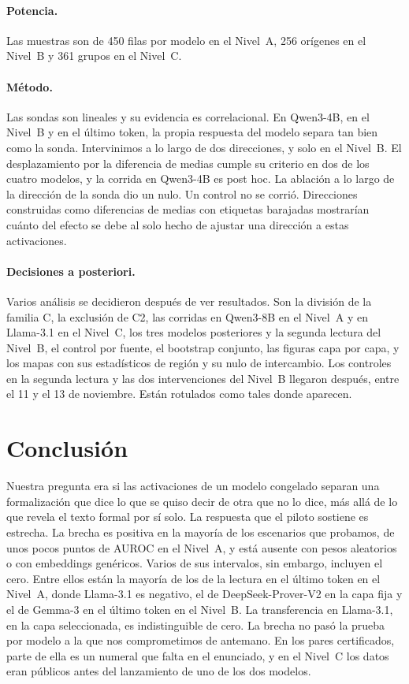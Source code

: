 \documentclass[10pt]{article}
\begin{document}
\paragraph{Potencia.}
Las muestras son de 450 filas por modelo en el Nivel~A, 256 orígenes en el Nivel~B y 361 grupos en el Nivel~C.

\paragraph{Método.}
Las sondas son lineales y su evidencia es correlacional. En Qwen3-4B, en el Nivel~B y en el último token, la propia respuesta del modelo separa tan bien como la sonda. Intervinimos a lo largo de dos direcciones, y solo en el Nivel~B. El desplazamiento por la diferencia de medias cumple
su criterio en dos de los cuatro modelos, y la corrida en Qwen3-4B es post hoc. La ablación a lo largo de la dirección
de la sonda dio un nulo.
Un control no se corrió. Direcciones construidas como diferencias de medias con etiquetas barajadas mostrarían cuánto
del efecto se debe al solo hecho de ajustar una dirección a estas activaciones.

\paragraph{Decisiones a posteriori.}
Varios análisis se decidieron después de ver resultados. Son la división de la familia C, la exclusión de C2, las corridas en Qwen3-8B en el Nivel~A y en Llama-3.1 en el Nivel~C, los tres modelos posteriores y la segunda lectura del Nivel~B, el
control por fuente, el bootstrap conjunto, las figuras capa por capa, y los mapas con sus estadísticos de región y
su nulo de intercambio. Los controles en la segunda lectura y las dos intervenciones del Nivel~B llegaron después, entre el 11 y el 13
de noviembre. Están rotulados como tales donde aparecen.

\section{Conclusión}

Nuestra pregunta era si las activaciones de un modelo congelado separan una formalización que dice lo que se quiso
decir de otra que no lo dice, más allá de lo que revela el texto formal por sí solo. La respuesta que el piloto
sostiene es estrecha. La brecha es positiva en la mayoría de los escenarios que probamos, de unos pocos puntos de
AUROC en el Nivel~A, y está ausente con pesos aleatorios o con embeddings genéricos. Varios de sus intervalos, sin
embargo, incluyen el cero. Entre ellos están la mayoría de los de la lectura en el último token en el Nivel~A, donde Llama-3.1 es negativo, el de
DeepSeek-Prover-V2 en la capa fija y el de Gemma-3 en el último token en el Nivel~B. La transferencia en Llama-3.1, en la capa
seleccionada, es indistinguible de cero. La brecha no pasó la prueba por modelo a la que nos comprometimos de
antemano. En los pares certificados, parte de ella es un numeral que falta en el enunciado, y en el Nivel~C los
datos eran públicos antes del lanzamiento de uno de los dos modelos.
\end{document}
